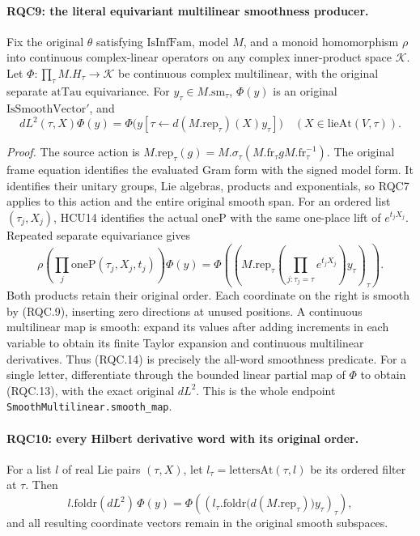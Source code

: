 \paragraph{RQC9: the literal equivariant multilinear smoothness producer.}
\label{claim:RQC9}
Fix the original \(\theta\) satisfying \(\mathrm{IsInfFam}\),
model \(M\), and a monoid homomorphism \(\rho\) into continuous
complex-linear operators on any complex inner-product space
\(\mathcal K\).  Let
\(\Phi:\prod_\tau M.H_\tau\to\mathcal K\) be continuous complex
multilinear, with the original separate \(\mathrm{atTau}\)
equivariance.  For \(y_\tau\in M.\mathrm{sm}_\tau\),
\(\Phi(y)\) is an original \(\mathrm{IsSmoothVector}'\), and
\[
 dL^2(\tau,X)\Phi(y)
 =\Phi\bigl(y[\tau\leftarrow d(M.\mathrm{rep}_\tau)(X)y_\tau]\bigr)
 \quad(X\in\mathrm{lieAt}(V,\tau)).
 \tag{RQC.13}
\]

\emph{Proof.}
The source action is
\(M.\mathrm{rep}_\tau(g)=
 M.\sigma_\tau(M.\mathrm{fr}_\tau gM.\mathrm{fr}_\tau^{-1})\).
The original frame equation identifies the evaluated Gram form
with the signed model form.  It identifies their unitary groups,
Lie algebras, products and exponentials, so RQC7 applies to this
action and the entire original smooth span.
For an ordered list \((\tau_j,X_j)\), HCU14 identifies the actual
\(\mathrm{oneP}\) with the same one-place lift of \(e^{t_jX_j}\).
Repeated separate equivariance gives
\[
 \rho\!\left(\prod_j\mathrm{oneP}(\tau_j,X_j,t_j)\right)\Phi(y)
 =\Phi\left(\left(
 M.\mathrm{rep}_\tau\!\left(
       \prod_{j:\tau_j=\tau}e^{t_jX_j}\right)y_\tau
                         \right)_\tau\right).
 \tag{RQC.14}
\]
Both products retain their original order.  Each coordinate on the
right is smooth by (RQC.9), inserting zero directions at unused
positions.  A continuous multilinear map is smooth: expand its
values after adding increments in each variable to obtain its
finite Taylor expansion and continuous multilinear derivatives.
Thus (RQC.14) is precisely the all-word smoothness predicate.
For a single letter, differentiate through the bounded linear
partial map of \(\Phi\) to obtain (RQC.13), with the exact
original \(dL^2\).  This is the whole endpoint
\texttt{SmoothMultilinear.smooth\_map}.

\paragraph{RQC10: every Hilbert derivative word with its original order.}
\label{claim:RQC10}
For a list \(l\) of real Lie pairs \((\tau,X)\), let
\(l_\tau=\mathrm{lettersAt}(\tau,l)\) be its ordered filter at
\(\tau\).  Then
\[
 l.\mathrm{foldr}(dL^2)\,\Phi(y)=
 \Phi\left(\left(
 l_\tau.\mathrm{foldr}\bigl(d(M.\mathrm{rep}_\tau)\bigr)y_\tau
                         \right)_\tau\right),
 \tag{RQC.15}
\]
and all resulting coordinate vectors remain in the original smooth
subspaces.

